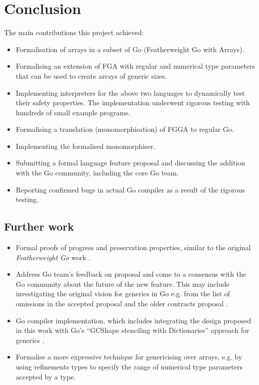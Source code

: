 \section{Conclusion}

The main contributions this project achieved:

\begin{itemize}
      \item Formalisation of arrays in a subset of Go (Featherweight Go with
            Arrays).
      \item Formalising an extension of FGA with regular and numerical type
            parameters that can be used to create arrays of generic sizes.
      \item Implementing interpreters for the above two languages to dynamically
            test their safety properties. The implementation underwent rigorous
            testing with hundreds of small example programs.
      \item Formalising a translation (monomorphisation) of FGGA to regular Go.
      \item Implementing the formalised monomorphiser.
      \item Submitting a formal language feature proposal and discussing the
            addition with the Go community, including the core Go team.
      \item Reporting confirmed bugs in actual Go compiler as a result of the
            rigorous testing.
\end{itemize}

\subsection{Further work}

\begin{itemize}
      \item Formal proofs of progress and preservation properties, similar to the
            original \emph{Featherweight Go} work \autocite{fg}.
      \item Address Go team's feedback on proposal \autocite{myProposal} and
            come to a consensus with the Go community about the future of the
            new feature. This may include investigating the original vision for
            generics in Go e.g. from the list of omissions in the accepted
            proposal \autocite{genericsProposal} and the older contracts
            proposal \autocite{contractsProposal}.
      \item Go compiler implementation, which includes integrating the design
            proposed in this work with Go's ``GCShape stenciling with
            Dictionaries'' approach for generics \autocite{generics1.18}.
      \item Formalise a more expressive technique for genericising over arrays,
            e.g. by using refinements types to specify the range of numerical
            type parameters accepted by a type.
\end{itemize}
